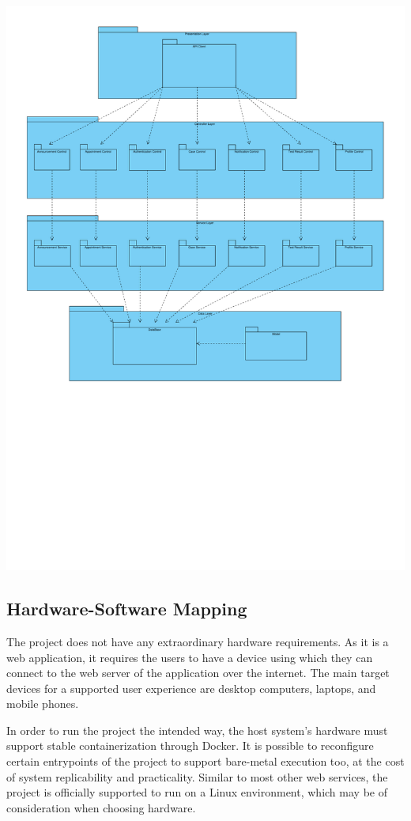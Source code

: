 \documentclass[a4paper, 12pt, titlepage]{article}
\begin{document}
  \includegraphics[width=\linewidth]{subsystem}

  \subsection{Hardware-Software Mapping}

  The project does not have any extraordinary hardware requirements.
  As it is a web application, it requires the users to have a device using which they can
  connect to the web server of the application over the internet.
  The main target devices for a supported user experience are desktop computers, laptops, and mobile phones.

  In order to run the project the intended way, the host system's hardware must support stable containerization through Docker.
  It is possible to reconfigure certain entrypoints of the project to support bare-metal execution too, at the cost of
  system replicability and practicality.
  Similar to most other web services, the project is officially supported to run on a Linux environment, which
  may be of consideration when choosing hardware.
\end{document}
